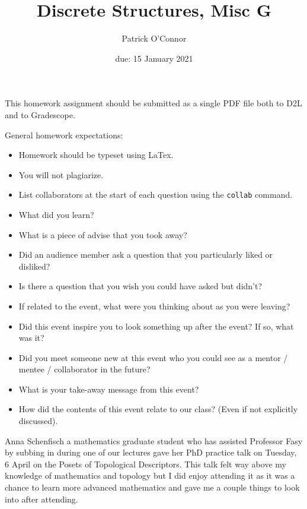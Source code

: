 \documentclass{article}
\title{Discrete Structures, Misc G}
\author{Patrick O'Connor}
\date{due: 15 January 2021}
\begin{document}
\maketitle

This homework assignment should be
submitted as a single PDF file both to D2L and to Gradescope.

General homework expectations:
\begin{itemize}
    \item Homework should be typeset using LaTex.
    \item You will not plagiarize.
    \item List collaborators at the start of each question using the
        \texttt{collab} command.
    \item What did you learn?
    \item     What is a piece of advise that you took away?
    \item     Did an audience member ask a question that you particularly liked or disliked?
    \item    Is there a question that you wish you could have asked but didn't?
    \item     If related to the event, what were you thinking about as you were leaving?
    \item   Did this event inspire you to look something up after the event? If so, what was it?
    \item    Did you meet someone new at this event who you could see as a mentor / mentee / collaborator in the future?
    \item     What is your take-away message from this event?
    \item    How did the contents of this event relate to our class? (Even if not explicitly discussed).
\end{itemize}


Anna Schenfisch a mathematics graduate student who has assisted Professor Fasy by subbing in during one of our lectures gave her PhD practice talk on Tuesday, 6 April 
on the Posets of Topological Descriptors. This talk felt way above my knowledge of mathematics and topology but I did enjoy attending it as it was a chance to learn 
more advanced mathematics and gave me a couple things to look into after attending.
\end{document}

